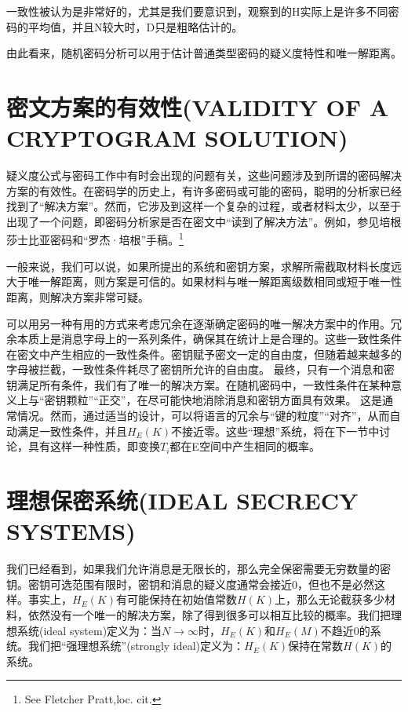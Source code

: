 \documentclass[]{article}
\begin{document}
\par

一致性被认为是非常好的，尤其是我们要意识到，观察到的H实际上是许多不同密码的平均值，并且N较大时，D只是粗略估计的。

由此看来，随机密码分析可以用于估计普通类型密码的疑义度特性和唯一解距离。

\newpage
%   
%

\section{密文方案的有效性(VALIDITY OF A CRYPTOGRAM SOLUTION)}

疑义度公式与密码工作中有时会出现的问题有关，这些问题涉及到所谓的密码解决方案的有效性。在密码学的历史上，有许多密码或可能的密码，聪明的分析家已经找到了“解决方案”。然而，它涉及到这样一个复杂的过程，或者材料太少，以至于出现了一个问题，即密码分析家是否在密文中“读到了解决方法”。例如，参见培根莎士比亚密码和“罗杰·培根”手稿。\footnote{ See Fletcher Pratt,loc. cit.}

一般来说，我们可以说，如果所提出的系统和密钥方案，求解所需截取材料长度远大于唯一解距离，则方案是可信的。如果材料与唯一解距离级数相同或短于唯一性距离，则解决方案非常可疑。

可以用另一种有用的方式来考虑冗余在逐渐确定密码的唯一解决方案中的作用。冗余本质上是消息字母上的一系列条件，确保其在统计上是合理的。这些一致性条件在密文中产生相应的一致性条件。密钥赋予密文一定的自由度，但随着越来越多的字母被拦截，一致性条件耗尽了密钥所允许的自由度。
最终，只有一个消息和密钥满足所有条件，我们有了唯一的解决方案。在随机密码中，一致性条件在某种意义上与“密钥颗粒”“正交”，在尽可能快地消除消息和密钥方面具有效果。
这是通常情况。然而，通过适当的设计，可以将语言的冗余与“键的粒度”“对齐”，从而自动满足一致性条件，并且$H_E(K)$不接近零。这些“理想”系统，将在下一节中讨论，具有这样一种性质，即变换$T_i$都在E空间中产生相同的概率。

\newpage
%   
%

\section{理想保密系统(IDEAL SECRECY SYSTEMS)}

我们已经看到，如果我们允许消息是无限长的，那么完全保密需要无穷数量的密钥。密钥可选范围有限时，密钥和消息的疑义度通常会接近0，但也不是必然这样。事实上，$H_E(K)$有可能保持在初始值常数$H(K)$上，那么无论截获多少材料，依然没有一个唯一的解决方案，除了得到很多可以相互比较的概率。我们把理想系统(ideal system)定义为：当$N\rightarrow \infty$时，$H_E(K)$和$H_E(M)$不趋近0的系统。我们把“强理想系统”(strongly ideal)定义为：$H_E(K)$保持在常数$H(K)$的系统。
\end{document}
